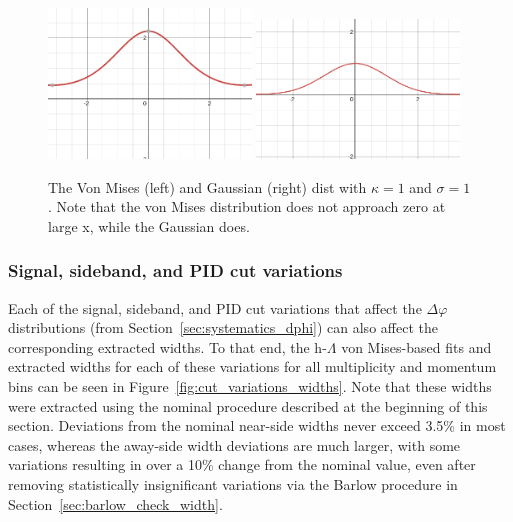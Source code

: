 \begin{figure}[ht]
    \centering
    \includegraphics[width=0.48\textwidth]{figures/analysis/von_plot.png}
    \includegraphics[width=0.48\textwidth]{figures/analysis/gaussian_plot.png}
    \caption{The Von Mises (left) and Gaussian (right) dist with $\kappa = 1$ and $\sigma = 1$. Note that the von Mises distribution does not approach zero at large x, while the Gaussian does.}
    \label{fig:von_mises_vs_gaus}
\end{figure}

\subsubsection{Signal, sideband, and PID cut variations}
\label{sec:cut_systematics_width}

Each of the signal, sideband, and PID cut variations that affect the $\Delta\varphi$ distributions (from Section~\ref{sec:systematics_dphi}) can also affect the corresponding extracted widths. To that end, the h-$\Lambda$ \dphi von Mises-based fits and extracted widths for each of these variations for all multiplicity and momentum bins can be seen in Figure~\ref{fig:cut_variations_widths}. Note that these widths were extracted using the nominal procedure described at the beginning of this section. Deviations from the nominal near-side widths never exceed 3.5\% in most cases, whereas the away-side width deviations are much larger, with some variations resulting in over a 10\% change from the nominal value, even after removing statistically insignificant variations via the Barlow procedure in Section~\ref{sec:barlow_check_width}. 

